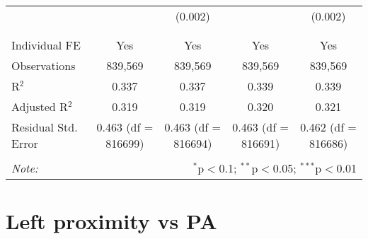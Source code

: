 \documentclass[
]{article}
\begin{document}
\begin{table}[!htbp]
{\begin{tabular}{@{\extracolsep{5pt}}lcccc}
  &  & (0.002) &  & (0.002) \\ 
  & & & & \\ 
\hline \\[-1.8ex] 
Individual FE & Yes & Yes & Yes & Yes \\ 
Observations & 839,569 & 839,569 & 839,569 & 839,569 \\ 
R$^{2}$ & 0.337 & 0.337 & 0.339 & 0.339 \\ 
Adjusted R$^{2}$ & 0.319 & 0.319 & 0.320 & 0.321 \\ 
Residual Std. Error & 0.463 (df = 816699) & 0.463 (df = 816694) & 0.463 (df = 816691) & 0.462 (df = 816686) \\ 
\hline 
\hline \\[-1.8ex] 
\textit{Note:}  & \multicolumn{4}{r}{$^{*}$p$<$0.1; $^{**}$p$<$0.05; $^{***}$p$<$0.01} \\ 
\end{tabular}
} 
\end{table} 
\newpage
\section{Left proximity vs PA}
\end{document}
